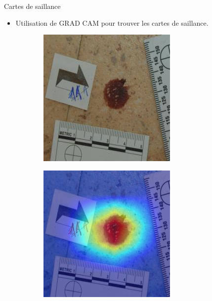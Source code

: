 \documentclass[11pt]{beamer}
\begin{document}
\begin{frame}{Cartes de saillance}
    \begin{itemize}
        \item Utilisation de GRAD CAM pour trouver les cartes de saillance.
    \end{itemize}
    \begin{figure}[ht]
        \centering
        \begin{subfigure}{0.40\textwidth}
            \centering
            \includegraphics[width=\linewidth]{../asset/exemple/14.jpg}
        \end{subfigure}
        \begin{subfigure}{0.40\textwidth}
            \centering
            \includegraphics[width=\linewidth]{../asset/exemple/14_saliency.png}

\end{subfigure}
\end{figure}
\end{frame}
\end{document}
